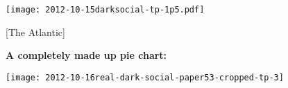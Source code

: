 





  \begin{center}
  \texttt{[image: 2012-10-15darksocial-tp-1p5.pdf]}

  \medskip

  \tiny {} [The Atlantic]
  \end{center}



  \textbf{A completely made up pie chart:}

  \begin{center}
    
    \texttt{[image: 2012-10-16real-dark-social-paper53-cropped-tp-3]}
  \end{center}





